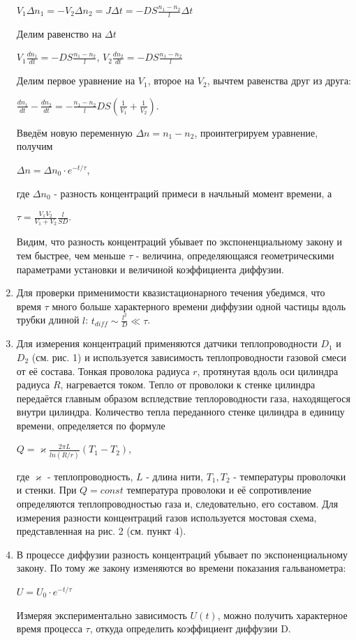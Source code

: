 \documentclass[12pt,a4paper]{article}
\begin{document}
\begin{enumerate}
\begin{center}
$V_1 \Delta n_1 = - V_2 \Delta n_2 = J \Delta t = -DS \frac{n_1-n_2}{l} \Delta t$
\end{center}
Делим равенство на $\Delta t$
\begin{center}
$V_1 \frac{dn_1}{dt} = -DS\frac{n_1-n_2}{l}$, $V_2 \frac{dn_2}{dt} = -DS\frac{n_1-n_2}{l}$
\end{center}
Делим первое уравнение на $V_1$, второе на $V_2$, вычтем равенства друг из друга:
\begin{center}
$\frac{dn_1}{dt}- \frac{dn_2}{dt} = - \frac{n_1-n_2}{l}DS(\frac{1}{V_1} +\frac{1}{V_2} )$.
\end{center}
Введём новую переменную $\Delta n = n_1-n_2$, проинтегрируем уравнение, получим
\begin{center}
$\Delta n = \Delta n_{0}\cdot e^{-t/\tau}$,
\end{center}
где $\Delta n_0$ - разность концентраций примеси в начльный момент времени, а
\begin{center}
$\tau = \frac{V_1 V_2}{V_1 + V_2} \frac {l}{SD}$.
\end{center}
Видим, что разность концентраций убывает по экспоненциальному закону и тем быстрее, чем меньше $\tau$ - величина, определяющаяся геометрическими параметрами установки и величиной коэффициента диффузии.
\item Для проверки применимости квазистационарного течения убедимся, что время $\tau$ много больше характерного времени диффузии одной частицы вдоль трубки длиной $l$: $t_{diff} \sim \frac{l^2}{D} \ll \tau$.

\item Для измерения концентраций применяются датчики теплопроводности $D_1$ и $D_2$ (см. рис. 1) и используется зависимость теплопроводности газовой смеси от её состава. Тонкая проволока радиуса $r$, протянутая вдоль оси цилиндра радиуса $R$, нагревается током. Тепло от проволоки к стенке цилиндра передаётся главным образом вспледствие теплороводности газа, находящегося внутри цилиндра. Количество тепла переданного стенке цилиндра в единицу времени, определяется по формуле 
\begin{center}
$Q = \varkappa \frac{2\pi L}{ln (R/r)}(T_1-T_2)$,
\end{center}
где $\varkappa$ - теплопроводность, $L$ - длина нити, $T_1, T_2$ - температуры проволочки и стенки. При $Q = const$ температура проволоки и её сопротивление определяются теплопроводностью газа и, следовательно, его составом. Для измерения разности концентраций газов используется  
мостовая схема, представленная на рис. 2 (см. пункт 4).

\item В процессе диффузии разность концентраций убывает по экспоненциальному закону. По тому же закону изменяются во времени показания гальванометра:
\begin{center}
$U = U_{0}\cdot e^{-t/\tau}$
\end{center}
Измеряя экспериментально зависимость $U(t)$, можно получить характерное время процесса $\tau$, откуда определить коэффициент диффузии D.
\end{enumerate}
\end{document}
